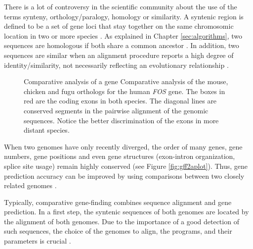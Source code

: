 There is a lot of controversy in the scientific community about the use of the terms synteny, 
orthology/paralogy, homology or similarity. A syntenic region 
 is defined to be a set of gene loci that stay together on the same chromosomic location in two 
or more species \citep{passarge:1999a}. As explained in Chapter \ref{sec:algorithms}, two sequences 
are homologous if both share a common ancestor \citep{jensen:2001a}. In addition, two sequences are 
similar  when an alignment procedure reports a high degree of identity/similarity, 
not necessarily reflecting an evolutionary relationship \citep{pertsemlidis:2001a}.


\begin{figure}[t!]
\begin{center}
\setlength{\fboxsep}{2pt}
          {Comparative analysis of a gene}%
          {Comparative analysis of the mouse, chicken and fugu orthologs for the human \emph{FOS} gene.}%
          {The boxes in red are the coding exons in both species. The diagonal lines are
conserved segments in the pairwise alignment of the genomic sequences. Notice the better discrimination
of the exons in more distant species.}
\end{center}
\end{figure}


When two genomes have only recently diverged, the order of many genes, gene numbers, gene positions
and even gene structures (exon-intron organization, splice site usage) remain highly conserved
(see Figure \ref{fig:gff2aplot}). Thus, gene prediction accuracy can be improved by using comparisons 
between two closely related genomes \citep{zhang:2002a}.

Typically, comparative gene-finding combines sequence alignment and gene prediction. In a first 
step, the syntenic sequences of both genomes are located by the alignment of both genomes. Due to
the importance of a good detection of such sequences, the choice of the genomes to align, the programs,
and their parameters is crucial \citep{korf:2003a,pertsemlidis:2001a,vidal:2003a}.

